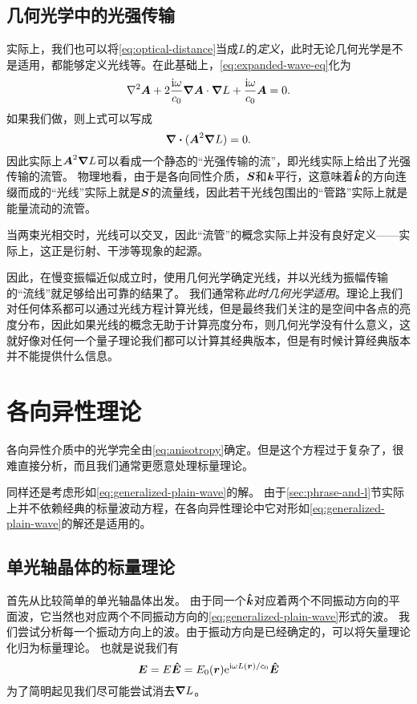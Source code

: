 \subsection{几何光学中的光强传输}

实际上，我们也可以将\eqref{eq:optical-distance}当成$L$的\emph{定义}，此时无论几何光学是不是适用，都能够定义光线等。在此基础上，\eqref{eq:expanded-wave-eq}化为
\begin{equation}
    \laplacian \vb*{A} + 2 \frac{\ii \omega}{c_0} \grad{\vb*{A}} \cdot \grad{L} + \frac{\ii \omega}{c_0} \vb*{A} = 0.
\end{equation}
如果我们做，则上式可以写成
\begin{equation}
    \div{(\vb*{A}^2 \grad{L})} = 0.
\end{equation}
因此实际上$\vb*{A}^2 \grad{L}$可以看成一个静态的“光强传输的流”，即光线实际上给出了光强传输的流管。
物理地看，由于是各向同性介质，$\vb*{S}$和$\vb*{k}$平行，这意味着$\vu*{k}$的方向连缀而成的“光线”实际上就是$\vb*{S}$的流量线，因此若干光线包围出的“管路”实际上就是能量流动的流管。

当两束光相交时，光线可以交叉，因此“流管”的概念实际上并没有良好定义——实际上，这正是衍射、干涉等现象的起源。%

因此，在慢变振幅近似成立时，使用几何光学确定光线，并以光线为振幅传输的“流线”就足够给出可靠的结果了。
我们通常称\emph{此时几何光学适用}。理论上我们对任何体系都可以通过光线方程计算光线，但是最终我们关注的是空间中各点的亮度分布，因此如果光线的概念无助于计算亮度分布，则几何光学没有什么意义，这就好像对任何一个量子理论我们都可以计算其经典版本，但是有时候计算经典版本并不能提供什么信息。

\section{各向异性理论}

各向异性介质中的光学完全由\eqref{eq:anisotropy}确定。但是这个方程过于复杂了，很难直接分析，而且我们通常更愿意处理标量理论。

同样还是考虑形如\eqref{eq:generalized-plain-wave}的解。
由于\ref{sec:phrase-and-l}节实际上并不依赖经典的标量波动方程，在各向异性理论中它对形如\eqref{eq:generalized-plain-wave}的解还是适用的。

\subsection{单光轴晶体的标量理论}

首先从比较简单的单光轴晶体出发。
由于同一个$\vu*{k}$对应着两个不同振动方向的平面波，它当然也对应两个不同振动方向的\eqref{eq:generalized-plain-wave}形式的波。
我们尝试分析每一个振动方向上的波。由于振动方向是已经确定的，可以将矢量理论化归为标量理论。
也就是说我们有
\[
    \vb*{E} = E \vu*{E} = E_0(\vb*{r}) \mathrm{e}^{\mathrm{i} \omega L(\vb*{r}) / c_0} \vu*{E}
\]
为了简明起见我们尽可能尝试消去$\grad{L}$。

